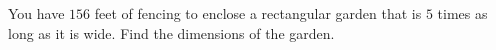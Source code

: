 You have $156$ feet of fencing to enclose a rectangular garden that is $5$ times as long as it is wide. Find the dimensions of the garden.
